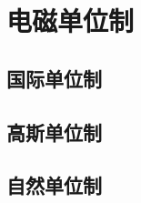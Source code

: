 

\section{电磁单位制}\label{20-4}

\subsection{国际单位制}\label{20-4-1}

\subsection{高斯单位制}\label{20-4-2}

\subsection{自然单位制}\label{20-4-3}